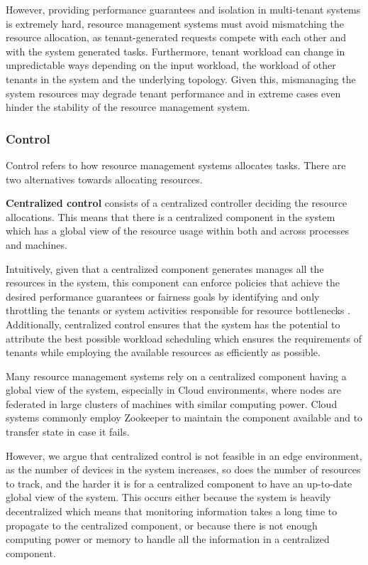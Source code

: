 However, providing performance guarantees and isolation in multi-tenant systems is extremely hard, resource management systems must avoid mismatching the resource allocation, as tenant-generated requests compete with each other and with the system generated tasks. Furthermore, tenant workload can change in unpredictable ways depending on the input workload, the workload of other tenants in the system and the underlying topology. Given this, mismanaging the system resources may degrade tenant performance and in extreme cases even hinder the stability of the resource management system.

\subsubsection{Control}

Control refers to how resource management systems allocates tasks. There are two alternatives towards allocating resources.

\textbf{Centralized control} consists of a centralized controller deciding the resource allocations. This means that there is a centralized component in the system which has a global view of the resource usage within both and across processes and machines.

Intuitively, given that a centralized component generates manages all the resources in the system, this component can enforce policies that achieve the desired performance guarantees or fairness goals by identifying and only throttling the tenants or system activities responsible for resource bottlenecks \cite{verma2015large}. Additionally, centralized control ensures that the system has the potential to attribute the best possible workload scheduling which ensures the requirements of tenants while employing the available resources as efficiently as possible.

Many resource management systems rely on a centralized component having a global view of the system, especially in Cloud environments, where nodes are federated in large clusters of machines with similar computing power. Cloud systems commonly employ Zookeeper \cite{hunt2010zookeeper} to maintain the component available and to transfer state in case it fails.

However, we argue that centralized control is not feasible in an edge environment, as the number of devices in the system increases, so does the number of resources to track, and the harder it is for a centralized component to have an up-to-date global view of the system. This occurs either because the system is heavily decentralized which means that monitoring information takes a long time to propagate to the centralized component, or because there is not enough computing power or memory to handle all the information in a centralized component.

